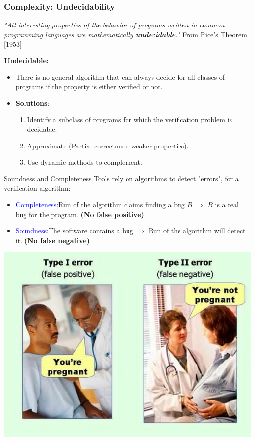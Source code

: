 \begin{frame}
\frametitle{Complexity: Undecidability}
\textit{"All interesting properties of the behavior of programs written in common programming languages are mathematically \textbf{undecidable}."} From Rice's Theorem [1953]
\newline

\textbf{Undecidable:}
\begin{itemize}
	\item There is no general algorithm that can always decide for all classes of programs if the property is either verified or not. 
	\item \textbf{Solutions}: 
	\begin{enumerate}
		\item Identify a subclass of programs for which the verification problem is decidable.
		\item Approximate (Partial correctness, weaker properties). 
		\item Use dynamic methods to complement.
	\end{enumerate}
\end{itemize} 
\end{frame}


\begin{frame}{Soundness and Completeness}
Tools rely on algorithms to detect "errors", for a verification algorithm:
\begin{itemize}
	\item \textcolor{blue}{Completeness}:\newline Run of the algorithm claims finding a bug $B$ $\Rightarrow$ $B$ is a real bug for the program.
	\textbf{(No false positive)}
	\item \textcolor{blue}{Soundness}:\newline The software contains a bug $\Rightarrow$  Run of the algorithm will detect it. \textbf{(No false negative)}
\end{itemize}
\centering
\includegraphics[scale=0.30]{content/images/static-analysis/FpFN.jpg}
\end{frame}


